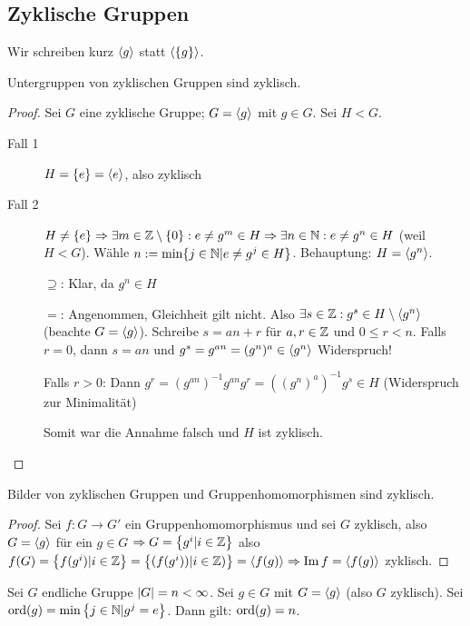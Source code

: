 \documentclass[12pt,a4paper]{scrartcl}
\begin{document}
\subsection{Zyklische Gruppen} \label{ch:zyklisch}
Wir schreiben kurz $\langle g\rangle$ statt $\langle\{g\}\rangle$.
\begin{satz}
	Untergruppen von zyklischen Gruppen sind zyklisch.
\end{satz}

\begin{proof}
	Sei $G$ eine zyklische Gruppe; $G = \langle g\rangle$ mit $g\in G$. Sei $H<G$.\begin{description}
		\item[Fall 1] $H = \{e\} = \langle e\rangle$, also zyklisch
		\item[Fall 2] $H\neq \{e\}\Rightarrow \exists m\in \mathbb Z\setminus\{0\}: e\neq g^m\in H\Rightarrow \exists n\in \mathbb N: e\neq g^n\in H$ (weil $H<G$). Wähle $n := \min\{j\in \mathbb N|e\neq g^j\in H\}$. Behauptung: $H = \langle g^n\rangle$.
		
		\glqq$\supseteq$\grqq: Klar, da $g^n\in H$
		
		\glqq$=$\grqq: Angenommen, Gleichheit gilt nicht. Also $\exists s\in \mathbb Z: g^s\in H\setminus\langle g^n\rangle$ (beachte $G = \langle g\rangle$). Schreibe $s = an+r$ für $a,r\in \mathbb Z$ und $0\leq r<n$. Falls $r = 0$, dann $s = an$ und $g^s = g^{an} = (g^n)^a\in \langle g^n\rangle$ Widerspruch!
		
		Falls $r>0$: Dann $g^r = (g^{an})^{-1}g^{an}g^r = ((g^n)^a)^{-1}g^s\in H$ (Widerspruch zur Minimalität)
		
		Somit war die Annahme falsch und $H$ ist zyklisch.
	\end{description}
\end{proof}


\begin{lem}
	Bilder von zyklischen Gruppen und Gruppenhomomorphismen sind zyklisch.
\end{lem}

\begin{proof}
	Sei $f: G \rightarrow G'$ ein Gruppenhomomorphismus und sei $G$ zyklisch, also $G = \langle g\rangle$ für ein $g \in G$ $\Rightarrow G = \left\lbrace g^i | i \in \mathbb Z \right\rbrace$ also $f(G) = \left\lbrace f(g^i) | i\in \mathbb Z \right\rbrace = \left\lbrace (f(g^i)) | i \in \mathbb Z)\right\rbrace = \langle f(g)\rangle \Rightarrow \operatorname{Im} f = \langle f(g)\rangle$ zyklisch.
\end{proof}

\begin{lem} \label{lem:ord}
	Sei $G$ endliche Gruppe $\lvert G\rvert = n < \infty$. Sei $g \in G$ mit $G=\langle g\rangle$ (also $G$ zyklisch).
	Sei $\operatorname{ord}(g) = \min \left\lbrace j \in \mathbb N | g^j = e\right\rbrace $.
	Dann gilt: $\operatorname{ord}(g) = n$. 
\end{lem}
\end{document}
